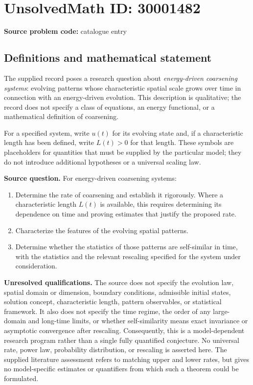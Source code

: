 \documentclass[11pt]{article}
\begin{document}
\section*{UnsolvedMath ID: 30001482}
\textbf{Source problem code:} catalogue entry
\subsection{Definitions and mathematical statement}
The supplied record poses a research question about \emph{energy-driven coarsening systems}: evolving patterns whose characteristic spatial scale grows over time in connection with an energy-driven evolution. This description is qualitative; the record does not specify a class of equations, an energy functional, or a mathematical definition of coarsening.

For a specified system, write \(u(t)\) for its evolving state and, if a characteristic length has been defined, write \(L(t)>0\) for that length. These symbols are placeholders for quantities that must be supplied by the particular model; they do not introduce additional hypotheses or a universal scaling law.

\textbf{Source question.} For energy-driven coarsening systems:
\begin{enumerate}
\item Determine the rate of coarsening and establish it rigorously. Where a characteristic length \(L(t)\) is available, this requires determining its dependence on time and proving estimates that justify the proposed rate.
\item Characterize the features of the evolving spatial patterns.
\item Determine whether the statistics of those patterns are self-similar in time, with the statistics and the relevant rescaling specified for the system under consideration.
\end{enumerate}

\textbf{Unresolved qualifications.} The source does not specify the evolution law, spatial domain or dimension, boundary conditions, admissible initial states, solution concept, characteristic length, pattern observables, or statistical framework. It also does not specify the time regime, the order of any large-domain and long-time limits, or whether self-similarity means exact invariance or asymptotic convergence after rescaling. Consequently, this is a model-dependent research program rather than a single fully quantified conjecture. No universal rate, power law, probability distribution, or rescaling is asserted here. The supplied literature assessment refers to matching upper and lower rates, but gives no model-specific estimates or quantifiers from which such a theorem could be formulated.
\end{document}

